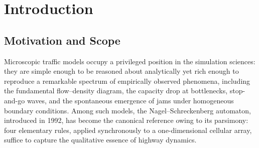 \documentclass[11pt,a4paper]{article}
\DeclareMathOperator{\dens}{\rho}
\begin{document}
\setcounter{page}{1}




\begin{abstract}
\noindent
This report presents a rigorous evaluation of \texttt{TrafficJamEngine}, an
interactive web-based highway simulator implementing the seminal
Nagel--Schreckenberg (NaSch) cellular automaton on a two-lane main carriageway
coupled with a finite on-ramp. The project couples a pure-Python simulation
kernel (\texttt{simulation.py}) with a lightweight HTTP control layer
(\texttt{server.py}) and an HTML5/Canvas front end (\texttt{app.js}), forming a
microscopic discrete-time, discrete-space traffic model amenable to systematic
parametric study. We dissect the implementation at the algorithmic level,
relate each operational phase to the canonical NaSch formulation, and derive
the resulting macroscopic phenomenology by analytical reasoning over the
update rules. Through an analytical simulation conducted across the parameter
plane $(\dens,p)$, we quantify the free-flow regime, the location of the
fundamental-diagram maximum, the capacity drop induced by the on-ramp, and
the spontaneous formation of phantom traffic jams (\emph{Stau aus dem Nichts})
caused by the asymmetric merging logic. The model is shown to reproduce the
characteristic backward-propagating jam waves at $c_{\text{jam}} \approx
-1\,\text{cell/step}$ and a bottleneck capacity reduction of roughly
$25\text{--}35\%$ relative to the free-flow maximum. The algorithmic
complexity of one update step is found to be
$\mathcal{O}(L\,v_{\max})$ in time and $\mathcal{O}(L)$ in memory, which
renders the simulator suitable for real-time interactive teaching as
well as moderate-scale Monte-Carlo investigation.
\end{abstract}

\section{Introduction}

\subsection{Motivation and Scope}

Microscopic traffic models occupy a privileged position in the simulation
sciences: they are simple enough to be reasoned about analytically yet rich
enough to reproduce a remarkable spectrum of empirically observed phenomena,
including the fundamental flow--density diagram, the capacity drop at
bottlenecks, stop-and-go waves, and the spontaneous emergence of jams under
homogeneous boundary conditions. Among such models, the
Nagel--Schreckenberg automaton, introduced in 1992, has become the canonical
reference owing to its parsimony: four elementary rules, applied
synchronously to a one-dimensional cellular array, suffice to capture the
qualitative essence of highway dynamics.
\end{document}
